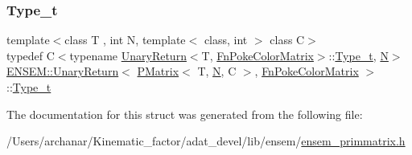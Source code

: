 \mbox{\label{structENSEM_1_1UnaryReturn_3_01PMatrix_3_01T_00_01N_00_01C_01_4_00_01FnPokeColorMatrix_01_4_a6a760e5a25e755f512b069ab1aee8a4d}} 
\subsubsection{\texorpdfstring{Type\_t}{Type\_t}\hspace{0.1cm}{\footnotesize\ttfamily [2/2]}}
{\footnotesize\ttfamily template$<$class T , int N, template$<$ class, int $>$ class C$>$ \\
typedef C$<$typename \mbox{\hyperlink{structENSEM_1_1UnaryReturn}{Unary\+Return}}$<$T, \mbox{\hyperlink{structENSEM_1_1FnPokeColorMatrix}{Fn\+Poke\+Color\+Matrix}}$>$\+::\mbox{\hyperlink{structENSEM_1_1UnaryReturn_3_01PMatrix_3_01T_00_01N_00_01C_01_4_00_01FnPokeColorMatrix_01_4_a6a760e5a25e755f512b069ab1aee8a4d}{Type\+\_\+t}}, \mbox{\hyperlink{operator__name__util_8cc_a7722c8ecbb62d99aee7ce68b1752f337}{N}}$>$ \mbox{\hyperlink{structENSEM_1_1UnaryReturn}{E\+N\+S\+E\+M\+::\+Unary\+Return}}$<$ \mbox{\hyperlink{classENSEM_1_1PMatrix}{P\+Matrix}}$<$ T, \mbox{\hyperlink{operator__name__util_8cc_a7722c8ecbb62d99aee7ce68b1752f337}{N}}, C $>$, \mbox{\hyperlink{structENSEM_1_1FnPokeColorMatrix}{Fn\+Poke\+Color\+Matrix}} $>$\+::\mbox{\hyperlink{structENSEM_1_1UnaryReturn_3_01PMatrix_3_01T_00_01N_00_01C_01_4_00_01FnPokeColorMatrix_01_4_a6a760e5a25e755f512b069ab1aee8a4d}{Type\+\_\+t}}}



The documentation for this struct was generated from the following file\+:\begin{DoxyCompactItemize}
\item 
/\+Users/archanar/\+Kinematic\+\_\+factor/adat\+\_\+devel/lib/ensem/\mbox{\hyperlink{lib_2ensem_2ensem__primmatrix_8h}{ensem\+\_\+primmatrix.\+h}}\end{DoxyCompactItemize}

